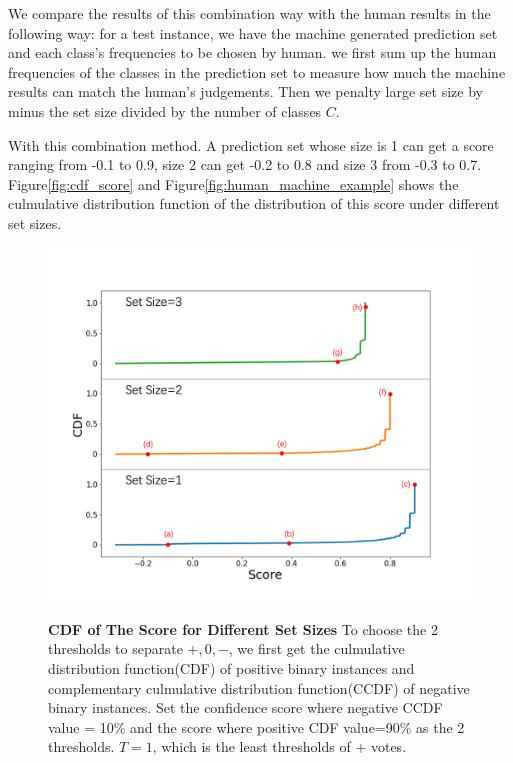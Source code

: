 \documentclass{article}
\begin{document}
We compare the results of this combination way with the human results in the following way:
for a test instance, we have the machine generated prediction set and each class's  frequencies to be chosen by human. we first sum up the human frequencies of the classes in the prediction set to measure how much the machine results can match the human's judgements. Then we penalty large set size by minus the set size divided by the number of classes $C$. 

With this combination method. A prediction set whose size is 1 can get a score ranging from -0.1 to 0.9, size 2 can get -0.2 to 0.8 and size 3 from -0.3 to 0.7. Figure\ref{fig:cdf_score} and Figure\ref{fig:human_machine_example} shows the culmulative distribution function of the distribution of this score under different set sizes.


\begin{figure}[H]
    \centering
    \includegraphics[scale=0.6]{figs/cdf_score_full.png}
    \label{cdf_score}
    \caption{\textbf{CDF of The Score for Different Set Sizes} To choose the 2 thresholds to separate $+,0,-$, we first get the culmulative distribution function(CDF) of positive binary instances and complementary culmulative distribution function(CCDF) of negative binary instances. Set the confidence score where negative CCDF value = 10\% and the score where positive CDF value=90\% as the 2 thresholds. $T=1$, which is the least thresholds of $+$ votes.}
\end{figure}
\end{document}
